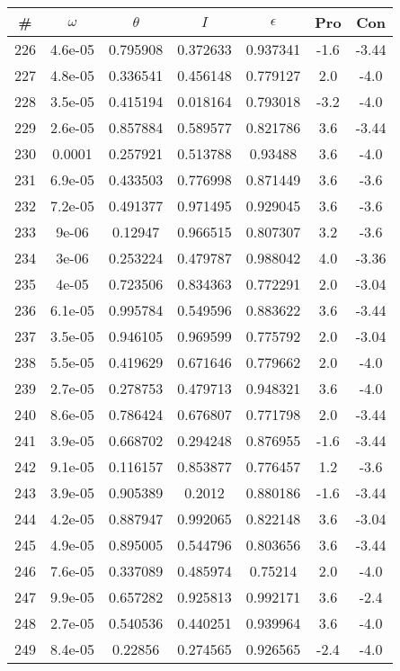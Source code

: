\begin{table}
\begin{tabular}{c|c|c|c|c|c|c}
\# & $\omega$ & $\theta$ & $I$ & $\epsilon$ & Pro & Con\\
\hline
226 & 4.6e-05 & 0.795908 & 0.372633 & 0.937341 & -1.6 & -3.44\\
227 & 4.8e-05 & 0.336541 & 0.456148 & 0.779127 & 2.0 & -4.0\\
228 & 3.5e-05 & 0.415194 & 0.018164 & 0.793018 & -3.2 & -4.0\\
229 & 2.6e-05 & 0.857884 & 0.589577 & 0.821786 & 3.6 & -3.44\\
230 & 0.0001 & 0.257921 & 0.513788 & 0.93488 & 3.6 & -4.0\\
231 & 6.9e-05 & 0.433503 & 0.776998 & 0.871449 & 3.6 & -3.6\\
232 & 7.2e-05 & 0.491377 & 0.971495 & 0.929045 & 3.6 & -3.6\\
233 & 9e-06 & 0.12947 & 0.966515 & 0.807307 & 3.2 & -3.6\\
234 & 3e-06 & 0.253224 & 0.479787 & 0.988042 & 4.0 & -3.36\\
235 & 4e-05 & 0.723506 & 0.834363 & 0.772291 & 2.0 & -3.04\\
236 & 6.1e-05 & 0.995784 & 0.549596 & 0.883622 & 3.6 & -3.44\\
237 & 3.5e-05 & 0.946105 & 0.969599 & 0.775792 & 2.0 & -3.04\\
238 & 5.5e-05 & 0.419629 & 0.671646 & 0.779662 & 2.0 & -4.0\\
239 & 2.7e-05 & 0.278753 & 0.479713 & 0.948321 & 3.6 & -4.0\\
240 & 8.6e-05 & 0.786424 & 0.676807 & 0.771798 & 2.0 & -3.44\\
241 & 3.9e-05 & 0.668702 & 0.294248 & 0.876955 & -1.6 & -3.44\\
242 & 9.1e-05 & 0.116157 & 0.853877 & 0.776457 & 1.2 & -3.6\\
243 & 3.9e-05 & 0.905389 & 0.2012 & 0.880186 & -1.6 & -3.44\\
244 & 4.2e-05 & 0.887947 & 0.992065 & 0.822148 & 3.6 & -3.04\\
245 & 4.9e-05 & 0.895005 & 0.544796 & 0.803656 & 3.6 & -3.44\\
246 & 7.6e-05 & 0.337089 & 0.485974 & 0.75214 & 2.0 & -4.0\\
247 & 9.9e-05 & 0.657282 & 0.925813 & 0.992171 & 3.6 & -2.4\\
248 & 2.7e-05 & 0.540536 & 0.440251 & 0.939964 & 3.6 & -4.0\\
249 & 8.4e-05 & 0.22856 & 0.274565 & 0.926565 & -2.4 & -4.0\\

\end{tabular}
\end{table}
